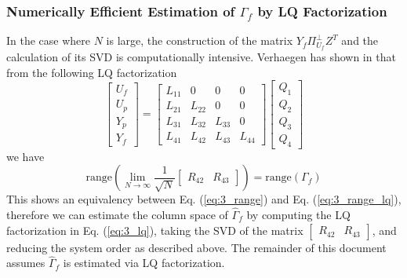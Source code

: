 \subsubsection*{Numerically Efficient Estimation of $\Gamma_f$ by LQ Factorization}
In the case where $N$ is large, the construction of the matrix $Y_f\Pi_{U_f}^\perp Z^T$ and the calculation of its SVD is computationally intensive. Verhaegen has shown in \cite{verhaegen1994identification} that from the following LQ factorization
\begin{equation}\label{eq:3_lq}
\begin{bmatrix}U_f\\ U_p\\ Y_p\\ Y_f\end{bmatrix} = 
\begin{bmatrix}
	L_{11} & 0 & 0 & 0\\
	L_{21} & L_{22} & 0 & 0\\
	L_{31} & L_{32} & L_{33} & 0\\
	L_{41} & L_{42} & L_{43} & L_{44}
\end{bmatrix}
\begin{bmatrix}Q_1\\ Q_2\\ Q_3\\ Q_4\end{bmatrix}
\end{equation}
we have
\begin{equation}\label{eq:3_range_lq}
\mbox{range}\left(\lim_{N\rightarrow\infty} \frac{1}{\sqrt{N}} \begin{bmatrix}R_{42} & R_{43}\end{bmatrix}\right) = \mbox{range}\left(\Gamma_f\right)
\end{equation}
This shows an equivalency between Eq. (\ref{eq:3_range}) and Eq. (\ref{eq:3_range_lq}), therefore we can estimate the column space of $\hat{\Gamma}_f$ by computing the LQ factorization in Eq. (\ref{eq:3_lq}), taking the SVD of the matrix $\begin{bmatrix}R_{42} & R_{43}\end{bmatrix}$, and reducing the system order as described above. The remainder of this document assumes $\hat{\Gamma}_f$ is estimated via LQ factorization.


